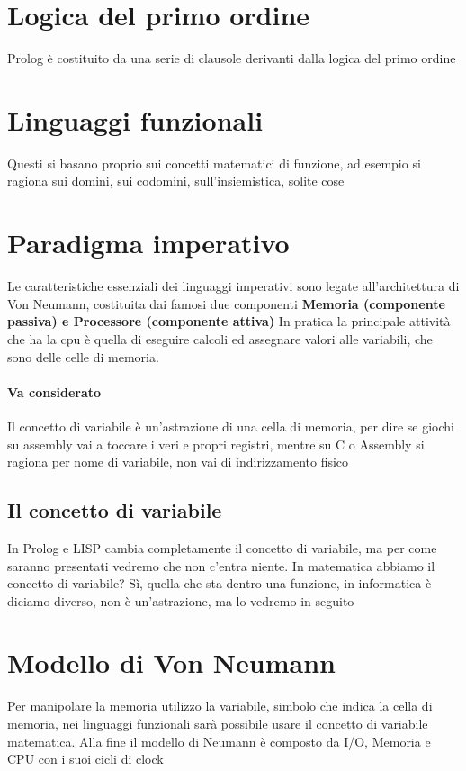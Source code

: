 \documentclass[12pt, a4paper, openany, oneside]{book}
\begin{document}
\section{Logica del primo ordine}
Prolog è costituito da una serie di clausole derivanti dalla logica del primo
ordine
\section{Linguaggi funzionali}
Questi si basano proprio sui concetti matematici di funzione, ad esempio si 
ragiona sui domini, sui codomini, sull'insiemistica, solite cose
\section{Paradigma imperativo}
Le caratteristiche essenziali dei linguaggi imperativi sono legate all'architettura 
di Von Neumann, costituita dai famosi due componenti 
\textbf{Memoria (componente passiva) e Processore (componente attiva)}
\newline
In pratica la principale attività che ha la cpu è quella di eseguire calcoli
ed assegnare valori alle variabili, che sono delle celle di memoria.
\paragraph{Va considerato}
Il concetto di variabile è un'astrazione di una cella di memoria, per dire 
se giochi su assembly vai a toccare i veri e propri registri, mentre su C o 
Assembly si ragiona per nome di variabile, non vai di indirizzamento fisico
\subsection{Il concetto di variabile}
In Prolog e LISP cambia completamente il concetto di variabile, ma per come 
saranno presentati vedremo che non c'entra niente. \newline
In matematica abbiamo il concetto di variabile? Sì, quella che sta dentro una
funzione, in informatica è diciamo diverso, non è un'astrazione, ma lo vedremo
in seguito
\section{Modello di Von Neumann}
Per manipolare la memoria utilizzo la variabile, simbolo che indica la cella 
di memoria, nei linguaggi funzionali sarà possibile usare il concetto di 
variabile matematica. 
\newline \newline
Alla fine il modello di Neumann è composto da I/O, Memoria e CPU con i suoi 
cicli di clock
\end{document}
